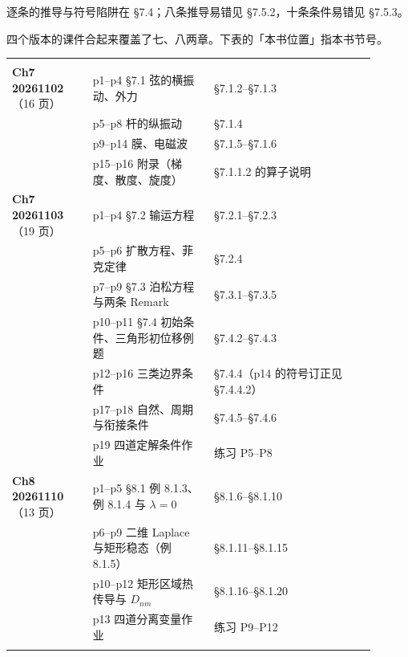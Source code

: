 逐条的推导与符号陷阱在 §7.4；八条推导易错见 §7.5.2，十条条件易错见 §7.5.3。


四个版本的课件合起来覆盖了七、八两章。下表的「本书位置」指本书节号。

\begin{center}
\tabtop
\begin{tabular}{@{}L{0.20\linewidth}L{0.30\linewidth}L{0.40\linewidth}@{}}
 &  &  \\
\tabmidrule
\textbf{Ch7 20261102}（16 页） & p1--p4 §7.1 弦的横振动、外力 & §7.1.2--§7.1.3 \\
 & p5--p8 杆的纵振动 & §7.1.4 \\
 & p9--p14 膜、电磁波 & §7.1.5--§7.1.6 \\
 & p15--p16 附录（梯度、散度、旋度） & §7.1.1.2 的算子说明 \\
\tabmidrule
\textbf{Ch7 20261103}（19 页） & p1--p4 §7.2 输运方程 & §7.2.1--§7.2.3 \\
 & p5--p6 扩散方程、菲克定律 & §7.2.4 \\
 & p7--p9 §7.3 泊松方程与两条 Remark & §7.3.1--§7.3.5 \\
 & p10--p11 §7.4 初始条件、三角形初位移例题 & §7.4.2--§7.4.3 \\
 & p12--p16 三类边界条件 & §7.4.4（p14 的符号订正见 §7.4.4.2） \\
 & p17--p18 自然、周期与衔接条件 & §7.4.5--§7.4.6 \\
 & p19 四道定解条件作业 & 练习 P5--P8 \\
\tabmidrule
\textbf{Ch8 20261110}（13 页） & p1--p5 §8.1 例 8.1.3、例 8.1.4 与 $\lambda=0$ & §8.1.6--§8.1.10 \\
 & p6--p9 二维 Laplace 与矩形稳态（例 8.1.5） & §8.1.11--§8.1.15 \\
 & p10--p12 矩形区域热传导与 $D_{nm}$ & §8.1.16--§8.1.20 \\
 & p13 四道分离变量作业 & 练习 P9--P12 \\
\tabmidrule
\end{tabular}
\tabbot
\end{center}

\clearpage

